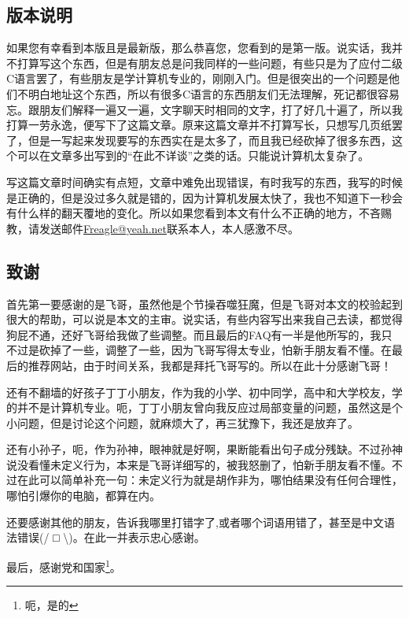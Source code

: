 \documentclass[11pt,twoside,a4paper,titlepage]{article}	%
\begin{document}
\subsection{版本说明}
如果您有幸看到本版且是最新版，那么恭喜您，您看到的是第一版。说实话，我并不打算写这个东西，但是有朋友总是问我同样的一些问题，有些只是为了应付二级C语言罢了，有些朋友是学计算机专业的，刚刚入门。但是很突出的一个问题是他们不明白地址这个东西，所以有很多C语言的东西朋友们无法理解，死记都很容易忘。跟朋友们解释一遍又一遍，文字聊天时相同的文字，打了好几十遍了，所以我打算一劳永逸，便写下了这篇文章。原来这篇文章并不打算写长，只想写几页纸罢了，但是一写起来发现要写的东西实在是太多了，而且我已经砍掉了很多东西，这个可以在文章多出写到的“在此不详谈”之类的话。只能说计算机太复杂了。

写这篇文章时间确实有点短，文章中难免出现错误，有时我写的东西，我写的时候是正确的，但是没过多久就是错的，因为计算机发展太快了，我也不知道下一秒会有什么样的翻天覆地的变化。所以如果您看到本文有什么不正确的地方，不吝赐教，请发送邮件\href{mailto:Freagle@yeah.net}{Freagle@yeah.net}联系本人，本人感激不尽。

\subsection{致谢}
首先第一要感谢的是飞哥，虽然他是个节操吞噬狂魔，但是飞哥对本文的校验起到很大的帮助，可以说是本文的主审。说实话，有些内容写出来我自己去读，都觉得狗屁不通，还好飞哥给我做了些调整。而且最后的FAQ有一半是他所写的，我只不过是砍掉了一些，调整了一些，因为飞哥写得太专业，怕新手朋友看不懂。在最后的推荐网站，由于时间关系，我都是拜托飞哥写的。所以在此十分感谢飞哥！

还有不翻墙的好孩子丁丁小朋友，作为我的小学、初中同学，高中和大学校友，学的并不是计算机专业。呃，丁丁小朋友曾向我反应过局部变量的问题，虽然这是个小问题，但是讨论这个问题，就麻烦大了，再三犹豫下，我还是放弃了。

还有小孙子，呃，作为孙神，眼神就是好啊，果断能看出句子成分残缺。不过孙神说没看懂未定义行为，本来是飞哥详细写的，被我怒删了，怕新手朋友看不懂。不过在此可以简单补充一句：未定义行为就是胡作非为，哪怕结果没有任何合理性，哪怕引爆你的电脑，都算在内。

还要感谢其他的朋友，告诉我哪里打错字了,或者哪个词语用错了，甚至是中文语法错误(/ □ \textbackslash)。在此一并表示忠心感谢。

最后，感谢党和国家\footnote{呃，是的}。
\end{document}
